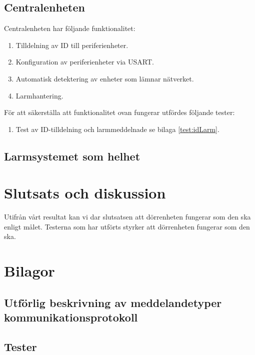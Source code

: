 \documentclass{article}
\begin{document}
 \subsection{Centralenheten}
 Centralenheten har följande funktionalitet:
 \begin{enumerate}
     \item Tilldelning av ID till periferienheter.
     \item Konfiguration av periferienheter via USART.
     \item Automatisk detektering av enheter som lämnar nätverket.
     \item Larmhantering.
 \end{enumerate}
 För att säkerställa att funktionalitet ovan fungerar utfördes följande tester:
 \begin{enumerate}
     \item Test av ID-tilldelning och larmmeddelnade se bilaga \ref{test:idLarm}.
 \end{enumerate}
 \subsection{Larmsystemet som helhet}
\section{Slutsats och diskussion}
Utifrån vårt resultat kan vi dar slutsatsen att dörrenheten fungerar som den
ska enligt målet. Testerna som har utförts styrker att dörrenheten fungerar som
den ska.





\section{Bilagor}
    \subsection{Utförlig beskrivning av meddelandetyper kommunikationsprotokoll}
    \label{bilaga:protokoll}
        
        
	\clearpage
	\subsection{Tester}
    		\label{bilaga:tester}
     	
         
         
\end{document}
